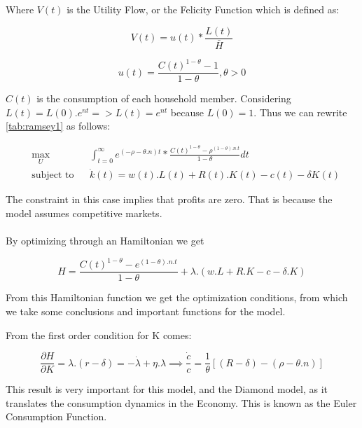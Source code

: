 Where $V(t)$ is the Utility Flow, or the Felicity Function which is defined as:

\begin{equation}
    V(t)=u(t)*\frac{L(t)}{\bar{H}}
\end{equation}


\begin{equation}
    u(t)=\frac{C(t)^{1-\theta}-1}{1-\theta} , \theta>0  
\end{equation}

$C(t)$ is the consumption of each household member. 
Considering $L(t)=L(0).e^{nt}=>L(t)=e^{nt}$ because $L(0)=1$. 
Thus we can rewrite \ref{tab:ramsey1} as follows: 

\begin{equation}
\begin{aligned}
 & \underset{U}{\max}
 & & \int_{t=0}^{\infty} e^{(-\rho-\theta.n) t}*\frac{C(t)^{1-\theta}-\rho^{(1-\theta).n.t}}{1-\theta}dt \\
 & \text{subject to} 
 & & \dot{k}(t)=w(t).L(t) + R(t).K(t)-c(t)-\delta K(t) 
\end{aligned}
\end{equation}

The constraint in this case implies that profits are zero. That is because the model assumes competitive markets. 

\paragraph{}

By optimizing through an Hamiltonian we get

\begin{equation*}
    H=\frac{C(t)^{1-\theta}-e^{(1-\theta).n.t}}{1-\theta}+\lambda.(w.L+R.K-c-\delta .K)
\end{equation*}

From this Hamiltonian function we get the optimization conditions, from which we take some conclusions and important functions for the model. 

From the first order condition for K comes: 

\begin{equation}
    \frac{\partial H}{\partial K}=\lambda.(r-\delta)=-\dot{\lambda}+\eta.\lambda \implies \frac{\dot{c}}{c}=\frac{1}{\theta}[(R-\delta)-(\rho - \theta.n)]
\label{tab:euler1}
\end{equation}

This result is very important for this model, and the Diamond model, as it translates the consumption dynamics in the Economy. This is known as the Euler Consumption Function.

